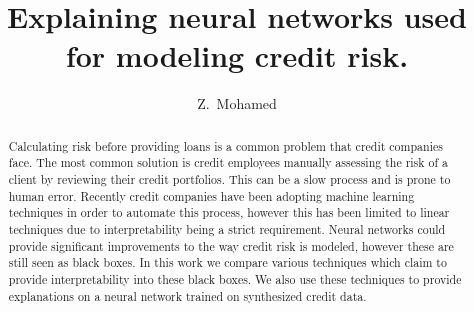 \documentclass[12pt, masters-t, a5block]{usthesis}
\title{Explaining neural networks used for modeling credit risk.}
\author{Z.\ Mohamed}{Zhunaid Mohamed}
\newcommand*{\WaterMark}[2][0.15\paperwidth]{%
        \AddToShipoutPicture*{\AtTextCenter{%
                \parbox[c]{0pt}{\makebox[0pt][c]{%
                    \texttt{[image: \#2]}}}}}}
\begin{document}
 \frontmatter
 \TitlePage
  \clearpage
  
 \DeclarationPage
  \clearpage
 
 \address{Department of Computer Science,\\
        University of Stellenbosch,\\
        Private Bag X1, Matieland 7602, South Africa.
             }
             
\begin{abstract}             
    Calculating risk before providing loans is a common problem that credit companies face. The most common solution is credit employees manually assessing the risk of a client by reviewing their credit portfolios. This can be a slow process and is prone to human error. Recently credit companies have been adopting machine learning techniques in order to automate this process, however this has been limited to linear techniques due to interpretability being a strict requirement. Neural networks could provide significant improvements to the way credit risk is modeled, however these are still seen as black boxes. In this work we compare various techniques which claim to provide interpretability into these black boxes. We also use these techniques to provide explanations on a neural network trained on synthesized credit data.
\end{abstract}
 \tableofcontents
 \clearpage

 \listoffigures
 \clearpage
 
 \listoftables
 \clearpage

 
 \mainmatter



 
 
 
 
 
 




\end{document}
